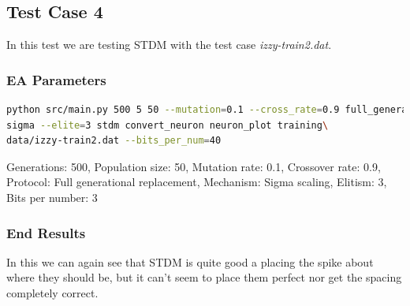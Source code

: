 \subsection{Test Case 4}\label{sec:test-case-4}
In this test we are testing STDM with the test case
\textit{izzy-train2.dat}.
\subsubsection{EA Parameters}\label{sec:test-case-4-parameters}
\begin{lstlisting}[frame=single, language=bash, caption=Command-line to
replicate the results]
python src/main.py 500 5 50 --mutation=0.1 --cross_rate=0.9 full_generational
sigma --elite=3 stdm convert_neuron neuron_plot training\
data/izzy-train2.dat --bits_per_num=40
\end{lstlisting}
Generations: 500, Population size: 50, Mutation rate: 0.1, Crossover rate: 0.9, Protocol: Full generational replacement, Mechanism: Sigma scaling, Elitism: 3, Bits per number: 3
\subsubsection{End Results}\label{sec:test-case-4-results}
In this we can again see that STDM is quite good a placing the spike about where
they should be, but it can't seem to place them perfect nor get the spacing
completely correct.

